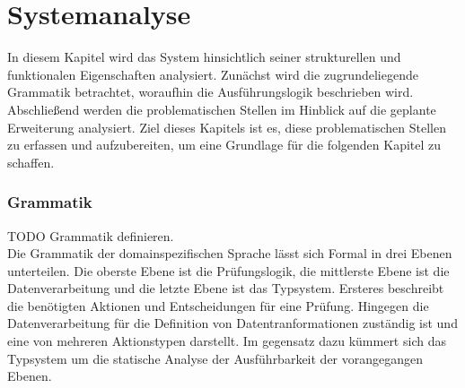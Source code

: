     \chapter{Systemanalyse}
    In diesem Kapitel wird das System hinsichtlich seiner strukturellen und funktionalen Eigenschaften analysiert. 
    Zunächst wird die zugrundeliegende Grammatik betrachtet, woraufhin die Ausführungslogik beschrieben wird. Abschließend werden die problematischen Stellen im Hinblick auf die geplante Erweiterung analysiert.
    Ziel dieses Kapitels ist es, diese problematischen Stellen zu erfassen und aufzubereiten, um eine Grundlage für die folgenden Kapitel zu schaffen.\\
    \subsection{Grammatik}
    \label{Grammatik}
    TODO Grammatik definieren.\\
    Die Grammatik der domainspezifischen Sprache lässt sich Formal in drei Ebenen unterteilen. 
    Die oberste Ebene ist die Prüfungslogik, die mittlerste Ebene ist die Datenverarbeitung und die letzte Ebene ist das Typsystem. \cite{99}
    Ersteres beschreibt die benötigten Aktionen und Entscheidungen für eine Prüfung. \cite{99}
    Hingegen die Datenverarbeitung für die Definition von Datentranformationen zuständig ist und eine von mehreren Aktionstypen darstellt. \cite{99}
    Im gegensatz dazu kümmert sich das Typsystem um die statische Analyse der Ausführbarkeit der vorangegangen Ebenen. \cite{99}

